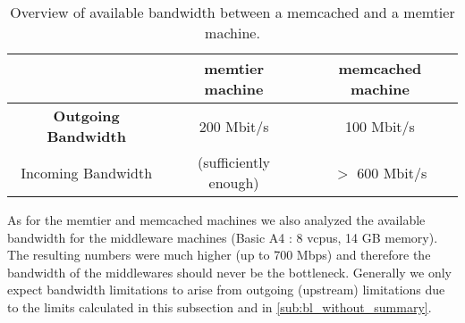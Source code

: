 \documentclass[11pt,a4paper]{article}
\let\tb\textbf
\begin{document}
\begin{table}[H]
\begin{center}
	\begin{tabular}{|c|c|c|}
		\hline            & memtier machine & memcached machine \\ 
		\hline \tb{Outgoing Bandwidth} &     200 Mbit/s               & 100 Mbit/s\\ 
		\hline Incoming Bandwidth &    (sufficiently enough)            & $>$ 600 Mbit/s\\ 
		\hline 
	\end{tabular}
\end{center}
\caption{Overview of available bandwidth between a memcached and a memtier machine.}
\label{tbl:bl_bw_overview}
\end{table}

As for the memtier and memcached machines we also analyzed the available bandwidth for the middleware machines (Basic A4 : 8 vcpus, 14 GB memory). The resulting numbers were much higher (up to 700 Mbps) and therefore the bandwidth of the middlewares should never be the bottleneck.
Generally we only expect bandwidth limitations to arise from outgoing (upstream) limitations due to the limits calculated in this subsection and in \ref{sub:bl_without_summary}.
\end{document}
